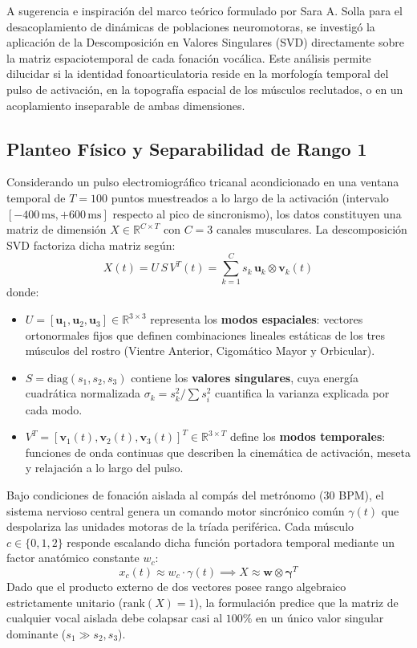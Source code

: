 \documentclass[11pt,a4paper,openany]{book}
\theoremstyle{definition}
\begin{document}
A sugerencia e inspiración del marco teórico formulado por Sara A. Solla para el desacoplamiento de dinámicas de poblaciones neuromotoras, se investigó la aplicación de la Descomposición en Valores Singulares (SVD) directamente sobre la matriz espaciotemporal de cada fonación vocálica. Este análisis permite dilucidar si la identidad fonoarticulatoria reside en la morfología temporal del pulso de activación, en la topografía espacial de los músculos reclutados, o en un acoplamiento inseparable de ambas dimensiones.

\subsection{Planteo Físico y Separabilidad de Rango 1}
\label{subsec:svd_planteo_fisico}

Considerando un pulso electromiográfico tricanal acondicionado en una ventana temporal de $T = 100$ puntos muestreados a lo largo de la activación (intervalo $[-400\,\text{ms}, +600\,\text{ms}]$ respecto al pico de sincronismo), los datos constituyen una matriz de dimensión $X \in \mathbb{R}^{C \times T}$ con $C = 3$ canales musculares. La descomposición SVD factoriza dicha matriz según:
\begin{equation}
X(t) = U \, S \, V^T(t) = \sum_{k=1}^C s_k \, \mathbf{u}_k \otimes \mathbf{v}_k(t)
\label{eq:svd_factorizacion_espaciotemporal}
\end{equation}
donde:
\begin{itemize}
    \item $U = [\mathbf{u}_1, \mathbf{u}_2, \mathbf{u}_3] \in \mathbb{R}^{3 \times 3}$ representa los \textbf{modos espaciales}: vectores ortonormales fijos que definen combinaciones lineales estáticas de los tres músculos del rostro (Vientre Anterior, Cigomático Mayor y Orbicular).
    \item $S = \text{diag}(s_1, s_2, s_3)$ contiene los \textbf{valores singulares}, cuya energía cuadrática normalizada $\sigma_k = s_k^2 / \sum s_i^2$ cuantifica la varianza explicada por cada modo.
    \item $V^T = [\mathbf{v}_1(t), \mathbf{v}_2(t), \mathbf{v}_3(t)]^T \in \mathbb{R}^{3 \times T}$ define los \textbf{modos temporales}: funciones de onda continuas que describen la cinemática de activación, meseta y relajación a lo largo del pulso.
\end{itemize}

Bajo condiciones de fonación aislada al compás del metrónomo (30 BPM), el sistema nervioso central genera un comando motor sincrónico común $\gamma(t)$ que despolariza las unidades motoras de la tríada periférica. Cada músculo $c \in \{0, 1, 2\}$ responde escalando dicha función portadora temporal mediante un factor anatómico constante $w_c$:
\begin{equation}
x_c(t) \approx w_c \cdot \gamma(t) \implies X \approx \mathbf{w} \otimes \boldsymbol{\gamma}^T
\end{equation}
Dado que el producto externo de dos vectores posee rango algebraico estrictamente unitario ($\text{rank}(X) = 1$), la formulación predice que la matriz de cualquier vocal aislada debe colapsar casi al $100\%$ en un único valor singular dominante ($s_1 \gg s_2, s_3$).
\end{document}
